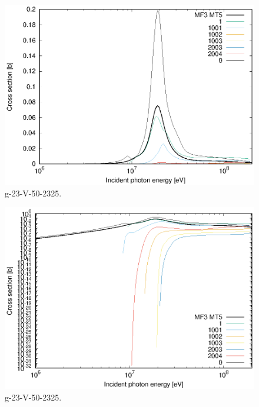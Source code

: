 \begin{figure}
 \includegraphics[width=\linewidth]{eps/g_23-V-50_2325.eps}
  \caption{g-23-V-50-2325.}
\end{figure}
\begin{figure}
 \includegraphics[width=\linewidth]{eps-log/g_23-V-50_2325.eps}
 \caption{g-23-V-50-2325.}
\end{figure}
\newpage \clearpage

